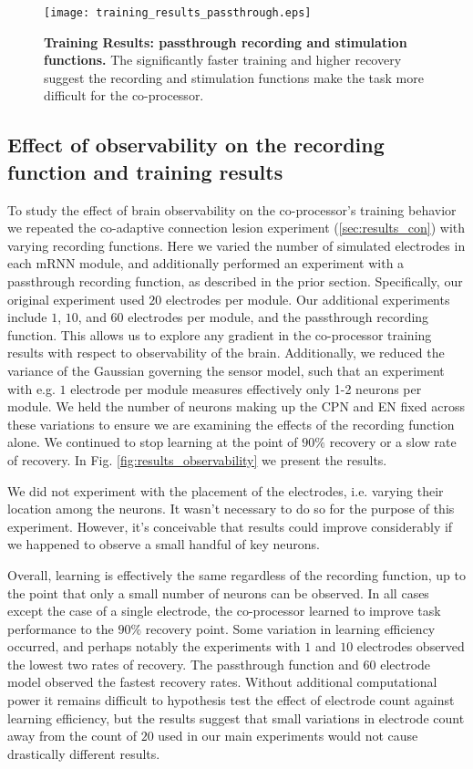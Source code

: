 \documentclass[12pt]{iopart}
\begin{document}
\begin{figure}[h!]
\centering
\texttt{[image: training\_results\_passthrough.eps]}
\caption{\textbf{Training Results: passthrough recording and stimulation functions.} The significantly faster
         training and higher recovery suggest the recording and stimulation functions make the task
         more difficult for the co-processor.}
\label{fig:results_passthrough}
\end{figure}

\subsection{Effect of observability on the recording function and training results}
\label{sup:observability}

To study the effect of brain observability on the co-processor's training behavior
we repeated the co-adaptive connection lesion experiment (\ref{sec:results_con})
with varying recording functions. Here we varied the number of simulated electrodes
in each mRNN module, and additionally performed an experiment with a passthrough recording
function, as described in the prior section. Specifically, our original experiment used
$20$ electrodes per module. Our additional experiments include $1$, $10$, and $60$ electrodes
per module, and the passthrough recording function. This allows us to explore any
gradient in the co-processor training results with respect to observability of the 
brain. Additionally, we reduced the variance of the Gaussian governing
the sensor model, such that an experiment with e.g. $1$ electrode per
module measures effectively only 1-2 neurons per module. We held the number of
neurons making up the CPN and EN fixed across these variations to ensure we
are examining the effects of the recording function alone. We continued to stop
learning at the point of $90\%$ recovery or a slow rate of recovery. In Fig.
\ref{fig:results_observability} we present the results.

We did not experiment with the placement of the electrodes, i.e. varying their
location among the neurons. It wasn't necessary to do so for the purpose of this
experiment. However, it's conceivable that results could improve considerably if we
happened to observe a small handful of key neurons.

Overall, learning is effectively the same regardless of the recording 
function, up to the point that only a small number of neurons can be 
observed. In all cases except the case of a single electrode, the co-processor
learned to improve task performance to the $90\%$ recovery point. Some variation
in learning efficiency occurred, and perhaps notably the experiments with $1$ and
$10$ electrodes observed the lowest two rates of recovery. The passthrough 
function and $60$ electrode model observed the fastest recovery rates.
Without additional computational power it remains difficult to hypothesis
test the effect of electrode count against learning efficiency, but the
results suggest that small variations in electrode count away from the
count of $20$ used in our main experiments would not cause drastically
different results.
\end{document}
